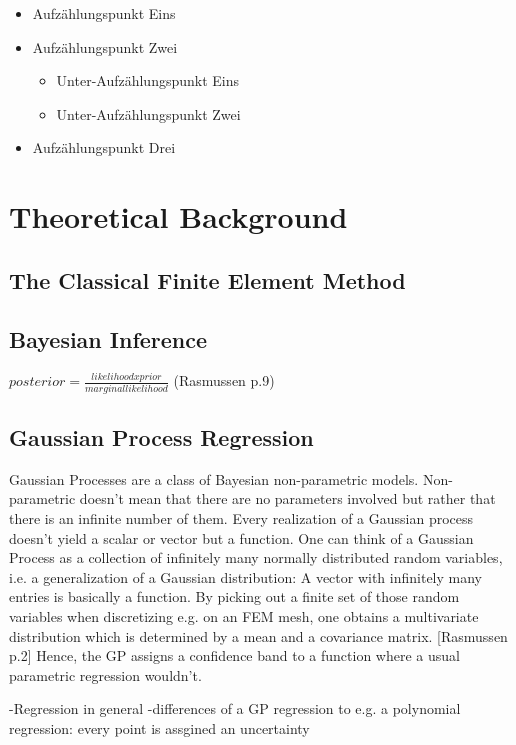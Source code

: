 \documentclass[%
  a4paper,oneside,%
  11pt,%
  smallchapters,
  green,%
  rgb, <cmyk>
  ,]{tubsbook}
\begin{document}
\lipsum[1]

\begin{itemize}
  \item Aufzählungspunkt Eins
  \item Aufzählungspunkt Zwei
    \begin{itemize}
      \item Unter-Aufzählungspunkt Eins
      \item Unter-Aufzählungspunkt Zwei
    \end{itemize}
  \item Aufzählungspunkt Drei
\end{itemize}

\chapter{Theoretical Background}

\section{The Classical Finite Element Method}

\section{Bayesian Inference}
$posterior = \frac{likelihood x prior}{marginal likelihood}$ (Rasmussen p.9)


\section{Gaussian Process Regression}
Gaussian Processes are a class of Bayesian non-parametric models. Non-parametric doesn't mean that there are no parameters involved but rather that there is an infinite number of them. Every realization of a Gaussian process doesn't yield a scalar or vector but a function. One can think of a Gaussian Process as a collection of infinitely many normally distributed random variables, i.e. a generalization of a Gaussian distribution: A vector with infinitely many entries is basically a function. By picking out a finite set of those random variables when discretizing e.g. on an FEM mesh, one obtains a multivariate distribution which is determined by a mean and a covariance matrix. [Rasmussen p.2] Hence, the GP assigns a confidence band to a function where a usual parametric regression wouldn't.

-Regression in general
-differences of a GP regression to e.g. a polynomial regression: every point is assgined an uncertainty
\end{document}
